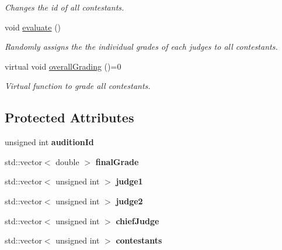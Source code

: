 \begin{DoxyCompactItemize}
\begin{DoxyCompactList}\small\item\em Changes the id of all contestants. \end{DoxyCompactList}\item 
\mbox{\label{class_phase_af57b6ad20a1b4790f55e97b8f68fdd7c}} 
void \hyperlink{class_phase_af57b6ad20a1b4790f55e97b8f68fdd7c}{evaluate} ()
\begin{DoxyCompactList}\small\item\em Randomly assigns the the individual grades of each judges to all contestants. \end{DoxyCompactList}\item 
\mbox{\label{class_phase_a672ed9cf455ca8dbf89fc56687d455b3}} 
virtual void \hyperlink{class_phase_a672ed9cf455ca8dbf89fc56687d455b3}{overall\+Grading} ()=0
\begin{DoxyCompactList}\small\item\em Virtual function to grade all contestants. \end{DoxyCompactList}\end{DoxyCompactItemize}
\subsection*{Protected Attributes}
\begin{DoxyCompactItemize}
\item 
\mbox{\label{class_phase_a3e576bda9c8be6db31bf3c46ab1284ca}} 
unsigned int {\bfseries audition\+Id}
\item 
\mbox{\label{class_phase_a44fede0ef598b2689aef0ecd213ac156}} 
std\+::vector$<$ double $>$ {\bfseries final\+Grade}
\item 
\mbox{\label{class_phase_abd94426c3e881880e3fea3d5d70310b9}} 
std\+::vector$<$ unsigned int $>$ {\bfseries judge1}
\item 
\mbox{\label{class_phase_a658128a2fbbe3b9bc4fb672bf851f45c}} 
std\+::vector$<$ unsigned int $>$ {\bfseries judge2}
\item 
\mbox{\label{class_phase_ad6179ca6a93733eb072e2808c357a2d4}} 
std\+::vector$<$ unsigned int $>$ {\bfseries chief\+Judge}
\item 
\mbox{\label{class_phase_ae0511c17f00d8856298e23a9288ba698}} 
std\+::vector$<$ unsigned int $>$ {\bfseries contestants}
\end{DoxyCompactItemize}


